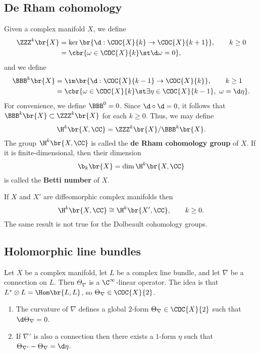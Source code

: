 \pagebreak

\subsection{De Rham cohomology}

Given a complex manifold $ X $, we define
\begin{align*}
\ZZZ^k\br{X}
& = \ker \br{\d : \COC{X}{k} \to \COC{X}{k + 1}}, \qquad k \ge 0 \\
& = \cbr{\omega \in \COC{X}{k} \st \d\omega = 0},
\end{align*}
and we define
\begin{align*}
\BBB^k\br{X}
& = \im \br{\d : \COC{X}{k - 1} \to \COC{X}{k}}, \qquad k \ge 1 \\
& = \cbr{\omega \in \COC{X}{k} \st \exists \eta \in \COC{X}{k - 1}, \ \omega = \d\eta}.
\end{align*}
For convenience, we define $ \BBB^0 = 0 $. Since $ \d \circ \d = 0 $, it follows that $ \BBB^k\br{X} \subset \ZZZ^k\br{X} $ for each $ k \ge 0 $. Thus, we may define
$$ \H^k\br{X, \CC} = \ZZZ^k\br{X} / \BBB^k\br{X}. $$
The group $ \H^k\br{X, \CC} $ is called the \textbf{de Rham cohomology group} of $ X $. If it is finite-dimensional, then their dimension
$$ \b_k\br{X} = \dim \H^k\br{X, \CC} $$
is called the \textbf{Betti number} of $ X $.

\begin{remark}
If $ X $ and $ X' $ are diffeomorphic complex manifolds then
$$ \H^k\br{X, \CC} \cong \H^k\br{X', \CC}, \qquad k \ge 0. $$
The same result is not true for the Dolbeault cohomology groups.
\end{remark}

\subsection{Holomorphic line bundles}

Let $ X $ be a complex manifold, let $ L $ be a complex line bundle, and let $ \nabla $ be a connection on $ L $. Then $ \Theta_\nabla $ is a $ \C^\infty $-linear operator. The idea is that $ L^* \otimes L = \Hom\br{L, L} $, so $ \Theta_\nabla \in \COC{X}{2} $.

\begin{proposition}
\hfill
\begin{enumerate}
\item The curvature of $ \nabla $ defines a global $ 2 $-form $ \Theta_\nabla \in \COC{X}{2} $ such that $ \d\Theta_\nabla = 0 $.
\item If $ \nabla' $ is also a connection then there exists a $ 1 $-form $ \eta $ such that $ \Theta_{\nabla'} - \Theta_\nabla = \d\eta $.
\end{enumerate}
\end{proposition}

